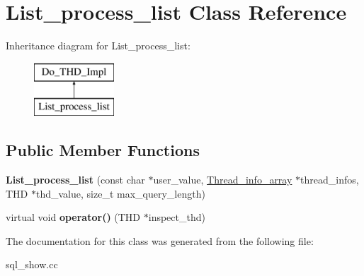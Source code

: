 \hypertarget{classList__process__list}{}\section{List\+\_\+process\+\_\+list Class Reference}
\label{classList__process__list}
Inheritance diagram for List\+\_\+process\+\_\+list\+:\begin{figure}[H]
\begin{center}
\leavevmode
\includegraphics[height=2.000000cm]{classList__process__list}
\end{center}
\end{figure}
\subsection*{Public Member Functions}
\begin{DoxyCompactItemize}
\item 
\mbox{\label{classList__process__list_a9d9c8ad99ec50fef464374fd013055a3}} 
{\bfseries List\+\_\+process\+\_\+list} (const char $\ast$user\+\_\+value, \mbox{\hyperlink{classMem__root__array}{Thread\+\_\+info\+\_\+array}} $\ast$thread\+\_\+infos, T\+HD $\ast$thd\+\_\+value, size\+\_\+t max\+\_\+query\+\_\+length)
\item 
\mbox{\label{classList__process__list_aed4c3e12a79ddf4eaf4833bd829a5f45}} 
virtual void {\bfseries operator()} (T\+HD $\ast$inspect\+\_\+thd)
\end{DoxyCompactItemize}


The documentation for this class was generated from the following file\+:\begin{DoxyCompactItemize}
\item 
sql\+\_\+show.\+cc\end{DoxyCompactItemize}
